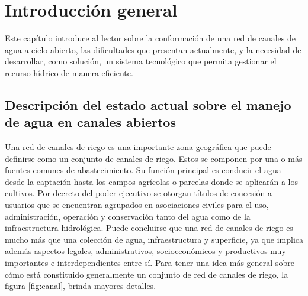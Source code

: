 
\chapter{Introducción general} %

\label{Chapter1} %
\label{IntroGeneral}

Este capítulo introduce al lector sobre la conformación de una red de canales de agua a cielo abierto, las dificultades que presentan actualmente, y la necesidad de desarrollar, como solución, un sistema tecnológico que permita gestionar el recurso hídrico de manera eficiente. 

\newcommand{\keyword}[1]{\textbf{#1}}
\newcommand{\tabhead}[1]{\textbf{#1}}
\newcommand{\code}[1]{\texttt{#1}}
\newcommand{\file}[1]{\texttt{\bfseries#1}}
\newcommand{\option}[1]{\texttt{\itshape#1}}
\newcommand{\grados}{$^{\circ}$}



\section{Descripción del estado actual sobre el manejo de agua en canales abiertos}

Una red de canales de riego es una importante zona geográfica que puede definirse como un conjunto de canales de riego. Estos se componen por una o más fuentes comunes de abastecimiento. Su función principal es conducir el agua desde la captación hasta los
campos agrícolas o parcelas donde se aplicarán a los cultivos. Por decreto del poder ejecutivo se otorgan títulos de concesión a usuarios que se encuentran agrupados en asociaciones civiles para el uso, administración, operación y conservación tanto del agua como de la infraestructura hidrológica.
Puede concluirse que una red de canales de riego es mucho más que una colección de agua, infraestructura y superficie, ya que implica además aspectos legales, administrativos, socioeconómicos y productivos muy importantes e interdependientes entre sí.
Para tener una idea más general sobre cómo está constituido generalmente un conjunto de red de canales de riego, la figura \ref{fig:canal}, brinda mayores detalles.


